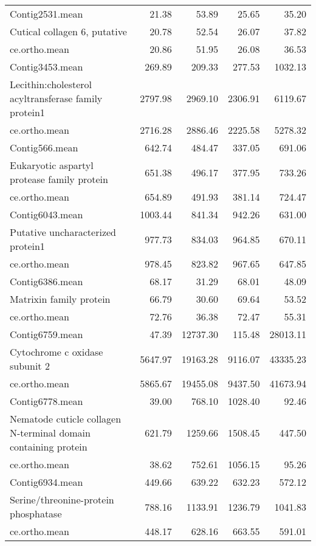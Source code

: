 \begin{longtable}{p{7cm}rrrr}
   \hline
Contig2531.mean & 21.38 & 53.89 & 25.65 & 35.20 \\ 
  Cutical collagen 6, putative & 20.78 & 52.54 & 26.07 & 37.82 \\ 
  ce.ortho.mean & 20.86 & 51.95 & 26.08 & 36.53 \\ 
   \hline
Contig3453.mean & 269.89 & 209.33 & 277.53 & 1032.13 \\ 
  Lecithin:cholesterol acyltransferase family protein1 & 2797.98 & 2969.10 & 2306.91 & 6119.67 \\ 
  ce.ortho.mean & 2716.28 & 2886.46 & 2225.58 & 5278.32 \\ 
   \hline
Contig566.mean & 642.74 & 484.47 & 337.05 & 691.06 \\ 
  Eukaryotic aspartyl protease family protein & 651.38 & 496.17 & 377.95 & 733.26 \\ 
  ce.ortho.mean & 654.89 & 491.93 & 381.14 & 724.47 \\ 
   \hline
Contig6043.mean & 1003.44 & 841.34 & 942.26 & 631.00 \\ 
  Putative uncharacterized protein1 & 977.73 & 834.03 & 964.85 & 670.11 \\ 
  ce.ortho.mean & 978.45 & 823.82 & 967.65 & 647.85 \\ 
   \hline
Contig6386.mean & 68.17 & 31.29 & 68.01 & 48.09 \\ 
  Matrixin family protein & 66.79 & 30.60 & 69.64 & 53.52 \\ 
  ce.ortho.mean & 72.76 & 36.38 & 72.47 & 55.31 \\ 
   \hline
Contig6759.mean & 47.39 & 12737.30 & 115.48 & 28013.11 \\ 
  Cytochrome c oxidase subunit 2 & 5647.97 & 19163.28 & 9116.07 & 43335.23 \\ 
  ce.ortho.mean & 5865.67 & 19455.08 & 9437.50 & 41673.94 \\ 
   \hline
Contig6778.mean & 39.00 & 768.10 & 1028.40 & 92.46 \\ 
  Nematode cuticle collagen N-terminal domain containing protein & 621.79 & 1259.66 & 1508.45 & 447.50 \\ 
  ce.ortho.mean & 38.62 & 752.61 & 1056.15 & 95.26 \\ 
   \hline
Contig6934.mean & 449.66 & 639.22 & 632.23 & 572.12 \\ 
  Serine/threonine-protein phosphatase & 788.16 & 1133.91 & 1236.79 & 1041.83 \\ 
  ce.ortho.mean & 448.17 & 628.16 & 663.55 & 591.01 \\ 
   \hline

\end{longtable}
